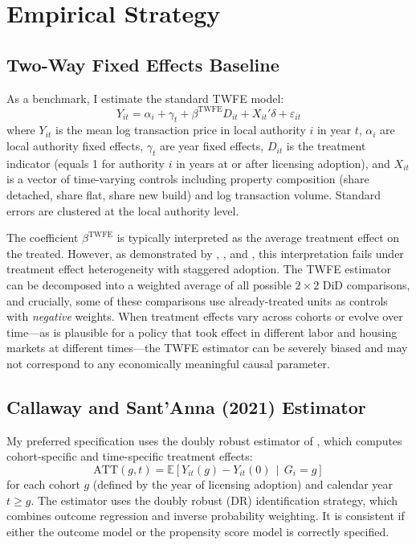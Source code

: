 \documentclass[12pt]{article}
\newcommand{\E}{\mathbb{E}}
\begin{document}
\section{Empirical Strategy}
\label{sec:strategy}

\subsection{Two-Way Fixed Effects Baseline}

As a benchmark, I estimate the standard TWFE model:
\begin{equation}
\label{eq:twfe}
Y_{it} = \alpha_i + \gamma_t + \beta^{\text{TWFE}} D_{it} + X_{it}'\delta + \varepsilon_{it}
\end{equation}
where $Y_{it}$ is the mean log transaction price in local authority $i$ in year $t$, $\alpha_i$ are local authority fixed effects, $\gamma_t$ are year fixed effects, $D_{it}$ is the treatment indicator (equals 1 for authority $i$ in years at or after licensing adoption), and $X_{it}$ is a vector of time-varying controls including property composition (share detached, share flat, share new build) and log transaction volume. Standard errors are clustered at the local authority level.

The coefficient $\beta^{\text{TWFE}}$ is typically interpreted as the average treatment effect on the treated. However, as demonstrated by \citet{goodman2021difference}, \citet{de2020two}, and \citet{borusyak2024revisiting}, this interpretation fails under treatment effect heterogeneity with staggered adoption. The TWFE estimator can be decomposed into a weighted average of all possible $2 \times 2$ DiD comparisons, and crucially, some of these comparisons use already-treated units as controls with \emph{negative} weights. When treatment effects vary across cohorts or evolve over time---as is plausible for a policy that took effect in different labor and housing markets at different times---the TWFE estimator can be severely biased and may not correspond to any economically meaningful causal parameter.

\subsection{Callaway and Sant'Anna (2021) Estimator}

My preferred specification uses the doubly robust estimator of \citet{callaway2021difference}, which computes cohort-specific and time-specific treatment effects:
\begin{equation}
\text{ATT}(g, t) = \E\left[Y_{it}(g) - Y_{it}(0) \,\middle|\, G_i = g\right]
\end{equation}
for each cohort $g$ (defined by the year of licensing adoption) and calendar year $t \geq g$. The estimator uses the doubly robust (DR) identification strategy, which combines outcome regression and inverse probability weighting. It is consistent if either the outcome model or the propensity score model is correctly specified.
\end{document}
